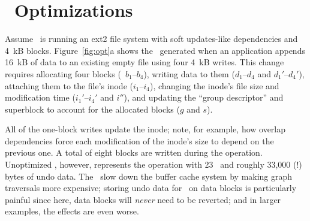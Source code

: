 
\section{\Patch\ Optimizations}
\label{sec:patch:optimizations}

\begin{comment}
A naive \Featherstitch\ implementation 
%
allows file system modules to define and modify consistency-preserving
orderings, and allows applications to add consistency requirements of their
own (using the interface described below).
%
But although all this is relatively easy, it performs badly.
\end{comment}


Assume \Kudos\ is running an ext2 file system with soft updates-like
dependencies and 4~kB blocks.
%
Figure~\ref{fig:opt}a shows the \patches\ generated when an application appends
16~kB of data to an existing empty file using four 4~kB writes.
%
%
%
%
This change requires allocating four blocks (\patches\ $b_1$--$b_4$),
writing data to them ($d_1$--$d_4$ and $d_1'$--$d_4'$), attaching them to the file's
inode ($i_1$--$i_4$), changing the inode's file size and modification time
($i_1'$--$i_4'$ and $i''$), and updating the ``group descriptor'' and superblock to
account for the allocated blocks ($g$ and $s$).
%
\begin{comment}
The operation is broken into four one-block appends; the numeric subscripts in
the \patch\ labels indicate with which each \patch\ is associated.
\end{comment}
%
All of the one-block writes update the inode; note, for example, how overlap
dependencies force each modification of the inode's size to depend on the
previous one.
%
A total of eight blocks are written during the operation.
%
Unoptimized \Kudos, however, represents the operation with 23 \patches\ and
roughly 33,000 (!) bytes of undo data.
%
The \patches\ slow down the buffer cache system by making graph traversals
more expensive;
%
storing undo data for \patches\ on data blocks is particularly painful
since here, data blocks will \emph{never} need to be reverted;
%
and in larger examples, the effects are even worse.



